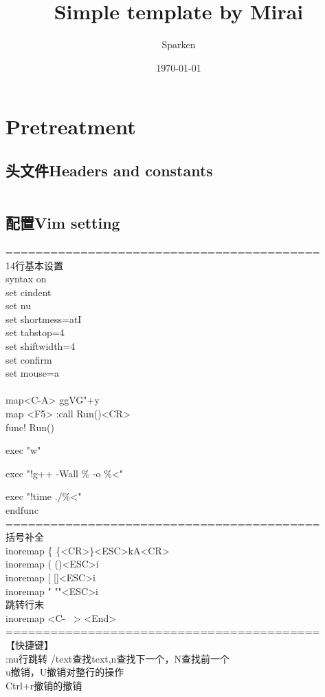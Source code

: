 \documentclass[twoside,sub3section,UTF8]{ctexart}						%
\title{Simple template by Mirai}						%
\author{Sparken}										%
\date{\today}											%
\begin{document}
\maketitle

\newpage
\tableofcontents 														%

\newpage 																%
\section{Pretreatment}												%
	\subsection{头文件Headers and constants}
	\inputminted[breaklines]{c++}{Other/headers.cpp}
	\newpage
	\subsection{配置Vim setting}
		\noindent==========================================\\
		14行基本设置\\
		syntax on\\
		set cindent\\
		set nu		\\
		set shortmess=atI	\\
		set tabstop=4\\
		set shiftwidth=4\\
		set confirm\\
		set mouse=a\\
\\
		map<C-A> ggVG"+y\\
		map <F5> :call Run()<CR>\\
		func! Run()\par
			exec "w"\par
			exec "!g++ -Wall \% -o \%<"\par
			exec "!time ./\%<"\\
		endfunc\\
		==========================================\\
		括号补全\\
		inoremap \{ \{<CR>\}<ESC>kA<CR>\\
		inoremap ( ()<ESC>i\\
		inoremap [ []<ESC>i\\
		inoremap " ""<ESC>i\\
		跳转行末\\
		inoremap <C- \ > <End>\\
		==========================================\\
		【快捷键】\\
		:nu行跳转
		/text查找text,n查找下一个，N查找前一个\\
		u撤销，U撤销对整行的操作\\
		Ctrl+r撤销的撤销\\
\end{document}
